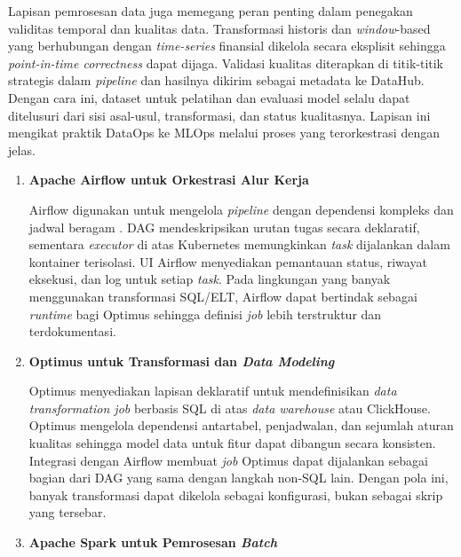 Lapisan pemrosesan data juga memegang peran penting dalam penegakan validitas temporal dan kualitas data. Transformasi historis dan \textit{window}-based yang berhubungan dengan \textit{time-series} finansial dikelola secara eksplisit sehingga \textit{point-in-time correctness} dapat dijaga. Validasi kualitas diterapkan di titik-titik strategis dalam \textit{pipeline} dan hasilnya dikirim sebagai metadata ke DataHub. Dengan cara ini, dataset untuk pelatihan dan evaluasi model selalu dapat ditelusuri dari sisi asal-usul, transformasi, dan status kualitasnya. Lapisan ini mengikat praktik DataOps ke MLOps melalui proses yang terorkestrasi dengan jelas.

\vspace{0.5em}
\begin{enumerate}
    \item \textbf{Apache Airflow untuk Orkestrasi Alur Kerja}  

    Airflow digunakan untuk mengelola \textit{pipeline} dengan dependensi kompleks dan jadwal beragam \autocite{airflow2024}. DAG mendeskripsikan urutan tugas secara deklaratif, sementara \textit{executor} di atas Kubernetes memungkinkan \textit{task} dijalankan dalam kontainer terisolasi. UI Airflow menyediakan pemantauan status, riwayat eksekusi, dan log untuk setiap \textit{task}. Pada lingkungan yang banyak menggunakan transformasi SQL/ELT, Airflow dapat bertindak sebagai \textit{runtime} bagi Optimus sehingga definisi \textit{job} lebih terstruktur dan terdokumentasi.

    \vspace{0.5em}

    \item \textbf{Optimus untuk Transformasi dan \textit{Data Modeling}}  

    Optimus menyediakan lapisan deklaratif untuk mendefinisikan \textit{data transformation job} berbasis SQL di atas \textit{data warehouse} atau ClickHouse. Optimus mengelola dependensi antartabel, penjadwalan, dan sejumlah aturan kualitas sehingga model data untuk fitur dapat dibangun secara konsisten. Integrasi dengan Airflow membuat \textit{job} Optimus dapat dijalankan sebagai bagian dari DAG yang sama dengan langkah non-SQL lain. Dengan pola ini, banyak transformasi dapat dikelola sebagai konfigurasi, bukan sebagai skrip yang tersebar.

    \vspace{0.5em}

    \item \textbf{Apache Spark untuk Pemrosesan \textit{Batch}}  


\end{enumerate}
